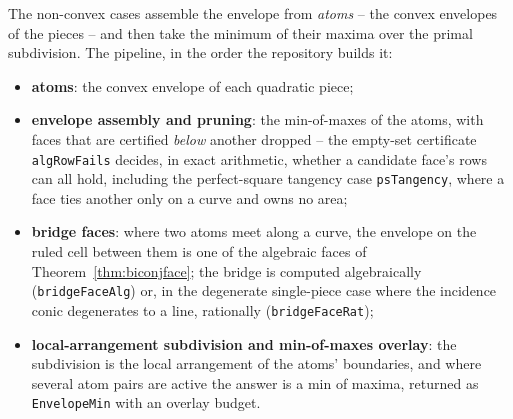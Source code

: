 \documentclass[11pt]{article}
\theoremstyle{definition}
\begin{document}
The non-convex cases assemble the envelope from \emph{atoms} -- the convex
envelopes of the pieces -- and then take the minimum of their maxima over the
primal subdivision. The pipeline, in the order the repository builds it:
\begin{itemize}[nosep,leftmargin=*]
\item \textbf{atoms}: the convex envelope of each quadratic piece;
\item \textbf{envelope assembly and pruning}: the min-of-maxes of the atoms,
  with faces that are certified \emph{below} another dropped -- the
  empty-set certificate \texttt{algRowFails} decides, in exact arithmetic,
  whether a candidate face's rows can all hold, including the perfect-square
  tangency case \texttt{psTangency}, where a face ties another only on a curve
  and owns no area;
\item \textbf{bridge faces}: where two atoms meet along a curve, the envelope
  on the ruled cell between them is one of the algebraic faces of
  Theorem~\ref{thm:biconjface}; the bridge is computed algebraically
  (\texttt{bridgeFaceAlg}) or, in the degenerate single-piece case where the
  incidence conic degenerates to a line, rationally (\texttt{bridgeFaceRat});
\item \textbf{local-arrangement subdivision and min-of-maxes overlay}: the
  subdivision is the local arrangement of the atoms' boundaries, and where
  several atom pairs are active the answer is a min of maxima, returned as
  \texttt{EnvelopeMin} with an overlay budget.
\end{itemize}
\end{document}
